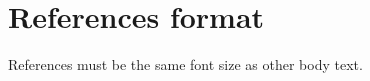\section{References format}
                                References must be the same font size as other body text.
                                                                \fi

